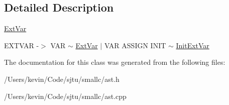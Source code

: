 \subsection{Detailed Description}
\hyperlink{class_ext_var}{Ext\+Var}

E\+X\+T\+V\+AR -\/$>$ V\+AR $\sim$ \hyperlink{class_ext_var}{Ext\+Var} $\vert$ V\+AR A\+S\+S\+I\+GN I\+N\+IT $\sim$ \hyperlink{class_init_ext_var}{Init\+Ext\+Var} 

The documentation for this class was generated from the following files\+:\begin{DoxyCompactItemize}
\item 
/\+Users/kevin/\+Code/sjtu/smallc/ast.\+h\item 
/\+Users/kevin/\+Code/sjtu/smallc/ast.\+cpp\end{DoxyCompactItemize}
